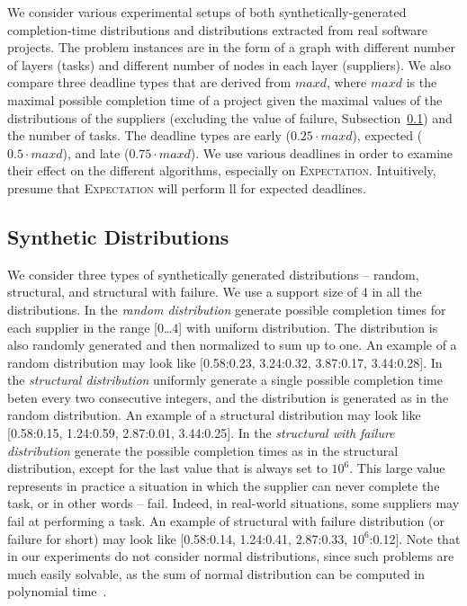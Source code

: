 \documentclass[letterpaper]{article} %
\newcommand{\expectation}{\textsc{Expectation}\xspace}
\begin{document}
We consider various experimental setups of both synthetically-generated completion-time distributions and distributions extracted from real software projects. The problem instances are in the form of a graph with different number of layers (tasks) and different number of nodes in each layer (suppliers). We also compare three deadline types that are derived from $maxd$, where $maxd$ is the maximal possible completion time of a project given the maximal values of the distributions of the suppliers (excluding the value of failure, Subsection~\ref{sec:SynthericDist}) and the number of tasks. The deadline types are early ($0.25\cdot maxd$), expected ($0.5\cdot maxd$), and late ($0.75\cdot maxd$). We use various deadlines in order to examine their effect on the different algorithms, especially on \expectation. Intuitively,  presume that \expectation will perform ll for expected deadlines.

\subsection{Synthetic Distributions}
\label{sec:SynthericDist}
We consider three types of synthetically generated distributions -- random, structural, and structural with failure. We use a support size of 4 in all the distributions. In the \emph{random distribution}  generate possible completion times for each supplier in the range [0\dots 4] with uniform distribution. The distribution is also randomly generated and then normalized to sum up to one. An example of a random distribution may look like [0.58:0.23, 3.24:0.32, 3.87:0.17, 3.44:0.28].
In the \emph{structural distribution}  uniformly generate a single possible completion time beten every two consecutive integers, and the distribution is generated as in the random distribution. An example of a structural distribution may look like [0.58:0.15, 1.24:0.59, 2.87:0.01, 3.44:0.25]. In the \emph{structural with failure distribution}  generate the possible completion times as in the structural distribution, except for the last value that is always set to $10^6$. This large value represents in practice a situation in which the supplier can never complete the task, or in other words -- fail. Indeed, in real-world situations, some suppliers may fail at performing a task. An example of structural with failure distribution (or failure for short) may look like [0.58:0.14, 1.24:0.41, 2.87:0.33, $10^6$:0.12].
Note that in our experiments  do not consider normal distributions, since such problems are much easily solvable, as the sum of normal distribution can be computed in polynomial time~\cite{schattenberg2005project,glaubius2009scheduling,olya2014applying}.
\end{document}

